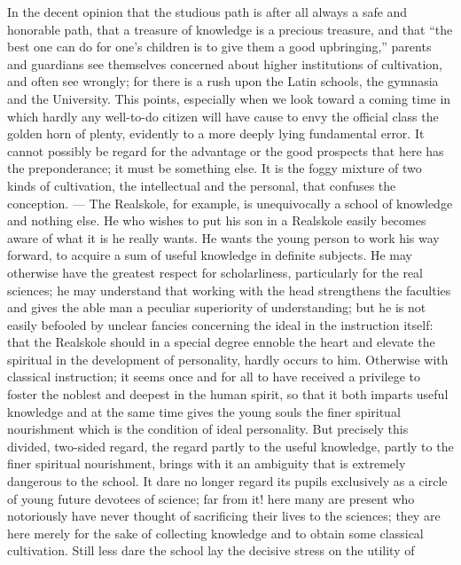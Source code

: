 \documentclass[12pt,a4paper,openany]{book}
\newcommand{\opage}[1]{\marginnote{\footnotesize\textit{[#1]}}}
\begin{document}
In the decent opinion that the studious path is after all
always a safe and honorable path, that a treasure of knowledge
is a precious treasure, and that ``the best one can
do for one's children is to give them a good upbringing,''
parents and guardians see themselves concerned about higher
institutions of cultivation, and often see wrongly; for there is
a rush upon the Latin schools, the gymnasia and the University.
This points, especially when we look toward a
coming time in which hardly any well-to-do citizen
will have cause to envy the official class the
golden horn of plenty, evidently to a more deeply lying
fundamental error. It cannot possibly be regard
for the advantage or the good prospects that here has the preponderance;
it must be something else. It is the foggy
mixture of two kinds of cultivation, the intellectual and the
personal, that confuses the conception. --- The Realskole, for example,
is unequivocally a school of knowledge and nothing else. He
who wishes to put his son in a Realskole easily becomes aware
of what it is he really wants. He wants the
young person to work his way forward, to acquire
\setcounter{footnote}{0}%
\opage{307}a sum of useful knowledge in definite subjects. He
may otherwise have the greatest respect for scholarliness,
particularly for the real sciences; he may understand
that working with the head strengthens the faculties and gives
the able man a peculiar superiority of understanding; but he
is not easily befooled by unclear fancies concerning the
ideal in the instruction itself: that the Realskole should in
a special degree ennoble the heart and elevate the spiritual
in the development of personality, hardly
occurs to him. Otherwise with classical instruction; it
seems once and for all to have received a privilege to foster
the noblest and deepest in the human spirit,
so that it both imparts useful knowledge and at the same time
gives the young souls the finer spiritual nourishment
which is the condition of ideal personality. But precisely
this divided, two-sided regard, the regard partly to the
useful knowledge, partly to the finer spiritual nourishment,
brings with it an ambiguity that is extremely dangerous to
the school. It dare no longer regard its pupils
exclusively as a circle of young future devotees of science;
far from it! here many are present who notoriously
have never thought of sacrificing their lives to the sciences;
they are here merely for the sake of collecting knowledge
and to obtain some classical cultivation. Still less
dare the school lay the decisive stress on the utility of
\end{document}

